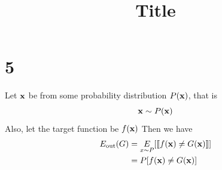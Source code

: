 \documentclass[11pt]{article}
\let\mathbb\relax
\theoremstyle{definition}
\begin{document}
\setcounter{section}{0}
\title{Title}

\thispagestyle{empty}
\section*{5}
Let $\vb{x}$ be from some probability distribution $P(\vb{x})$, that is
\[
  \vb{x} \sim P(\vb{x})
\]
Also, let the target function be $f(\vb{x})$
Then we have
\begin{align*}
  E_\text{out}(G) &= \underset{x\sim P}{\mathbb{E}}[\llbracket f(\vb{x}) \neq G(\vb{x})\rrbracket] \\ 
  &= \mathbb{P}[f(\vb{x})\neq G(\vb{x})]
\end{align*}
\end{document}
